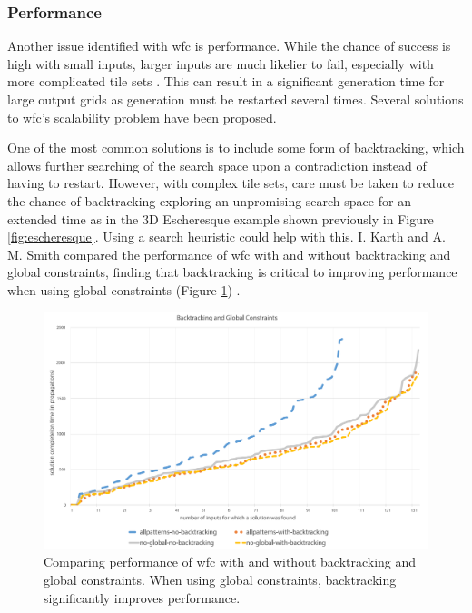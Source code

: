 
\subsubsection{Performance}\label{sec:performance}
Another issue identified with \acrshort{wfc} is performance. While the chance of success is high with small inputs, larger inputs are much likelier to fail, especially with more complicated tile sets \cite{WFC_ConstraintSolving_and_ML}. This can result in a significant generation time for large output grids as generation must be restarted several times. Several solutions to \acrshort{wfc}'s scalability problem have been proposed.%

One of the most common solutions is to include some form of backtracking, which allows further searching of the search space upon a contradiction instead of having to restart. However, with complex tile sets, care must be taken to reduce the chance of backtracking exploring an unpromising search space for an extended time as in the 3D Escheresque example shown previously in Figure \ref{fig:escheresque}. Using a search heuristic could help with this. I. Karth and A. M. Smith compared the performance of \acrshort{wfc} with and without backtracking and global constraints, finding that backtracking is critical to improving performance when using global constraints (Figure \ref{fig:backtrackingPerformance}) \cite{WFC_ConstraintSolving_and_ML}.

\begin{figure}[H]
    \centering
    \includegraphics[width=\textwidth, height=0.3\textheight, keepaspectratio]{Images/BacktrackingPerformance.png}
    \caption{Comparing performance of \acrshort{wfc} with and without backtracking and global constraints. When using global constraints, backtracking significantly improves performance. \cite{WFC_ConstraintSolving_and_ML}}
    \label{fig:backtrackingPerformance}
\end{figure}

